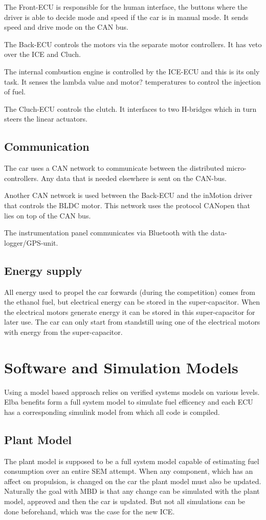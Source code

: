 The Front-ECU is responsible for the human interface, the buttons where the
driver is able to decide mode and speed if the car is in manual mode. It sends
speed and drive mode on the CAN bus.

The Back-ECU controls the motors via the separate motor controllers. It has
veto over the ICE and Cluch.

The internal combustion engine is controlled by the ICE-ECU and this is its
only task. It senses the lambda value and motor? temperatures to control the
injection of fuel.

The Cluch-ECU controls the clutch. It interfaces to two H-bridges which in turn
steers the linear actuators.  

\subsection{Communication}
The car uses a CAN network to communicate between the distributed
micro-controllers. Any data that is needed elsewhere is sent on the CAN-bus. 

Another CAN network is used between the Back-ECU and the inMotion driver that
controls the BLDC motor. This network uses the protocol CANopen that
lies on top of the CAN bus.

The instrumentation panel communicates via Bluetooth with the data-logger/GPS-unit.

\subsection{Energy supply}
All energy used to propel the car forwards (during the competition) comes from
the ethanol fuel, but electrical energy can be stored in the super-capacitor.
When the electrical motors generate energy it can be stored in this
super-capacitor for later use. The car can only start from standstill using one
of the electrical motors with energy from the super-capacitor.  

\section{Software and Simulation Models}
Using a model based approach relies on verified systems models on various levels. Elba benefits form a full system model to simulate fuel efficency and each ECU has a corresponding simulink model from which all code is compiled.

\subsection{Plant Model}
The plant model is supposed to be a full system model capable of estimating fuel consumption over an entire SEM attempt. When any component, which has an affect on propulsion, is changed on the car the plant model must also be updated. Naturally the goal with MBD is that any change can be simulated with the plant model, approved and then the car is updated. But not all simulations can be done beforehand, which was the case for the new ICE.\@

